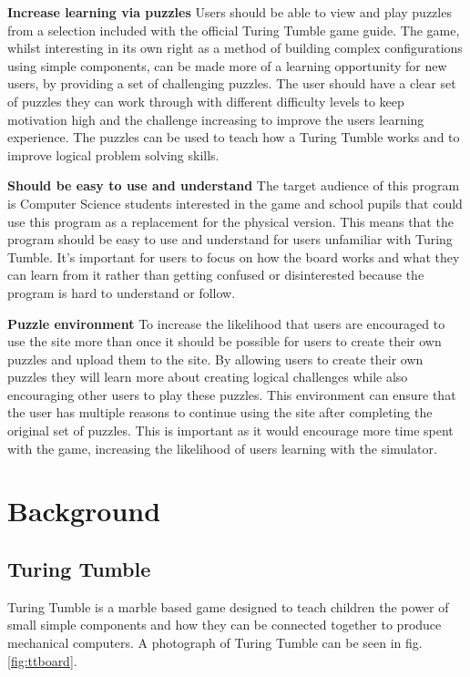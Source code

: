 \documentclass{l4proj}
\begin{document}
\textbf{Increase learning via puzzles} Users should be able to view and play puzzles from a selection included with the official Turing Tumble game guide. The game, whilst interesting in its own right as a method of building complex configurations using simple components, can be made more of a learning opportunity for new users, by providing a set of challenging puzzles. The user should have a clear set of puzzles they can work through with different difficulty levels to keep motivation high and the challenge increasing to improve the users learning experience. The puzzles can be used to teach how a Turing Tumble works and to improve logical problem solving skills.   

\textbf{Should be easy to use and understand} The target audience of this program is Computer Science students interested in the game and school pupils that could use this program as a replacement for the physical version. This means that the program should be easy to use and understand for users unfamiliar with Turing Tumble. It's important for users to focus on how the board works and what they can learn from it rather than getting confused or disinterested because the program is hard to understand or follow. 

\textbf{Puzzle environment} To increase the likelihood that users are encouraged to use the site more than once it should be possible for users to create their own puzzles and upload them to the site. By allowing users to create their own puzzles they will learn more about creating logical challenges while also encouraging other users to play these puzzles. This environment can ensure that the user has multiple reasons to continue using the site after completing the original set of puzzles. This is important as it would encourage more time spent with the game, increasing the likelihood of users learning with the simulator. 

\chapter{Background}
\section{Turing Tumble}
\label{section:background}
Turing Tumble is a marble based game designed to teach children the power of small simple components and how they can be connected together to produce mechanical computers. A photograph of Turing Tumble can be seen in fig. \ref{fig:ttboard}.
\end{document}
